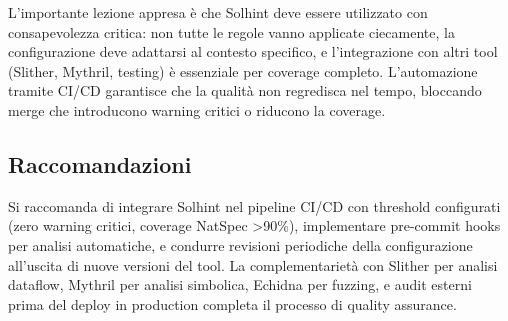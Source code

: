 \documentclass[12pt,a4paper]{article}
\begin{document}
L'importante lezione appresa è che Solhint deve essere utilizzato con consapevolezza critica: non tutte le regole vanno applicate ciecamente, la configurazione deve adattarsi al contesto specifico, e l'integrazione con altri tool (Slither, Mythril, testing) è essenziale per coverage completo. L'automazione tramite CI/CD garantisce che la qualità non regredisca nel tempo, bloccando merge che introducono warning critici o riducono la coverage.

\subsection{Raccomandazioni}

Si raccomanda di integrare Solhint nel pipeline CI/CD con threshold configurati (zero warning critici, coverage NatSpec >90\%), implementare pre-commit hooks per analisi automatiche, e condurre revisioni periodiche della configurazione all'uscita di nuove versioni del tool. La complementarietà con Slither per analisi dataflow, Mythril per analisi simbolica, Echidna per fuzzing, e audit esterni prima del deploy in production completa il processo di quality assurance.
\end{document}
